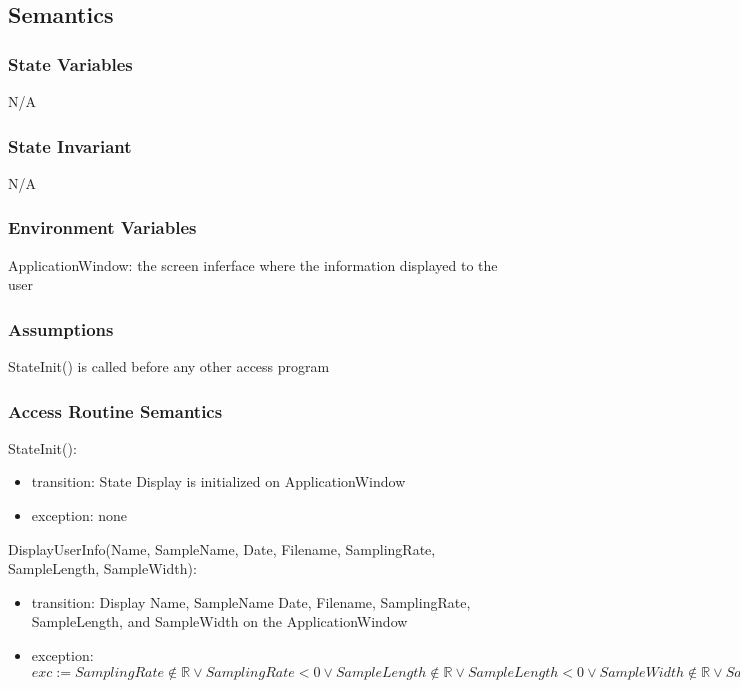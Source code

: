 \documentclass[12pt, titlepage]{article}
\begin{document}
\subsection{Semantics}

\subsubsection{State Variables}

N/A

\subsubsection{State Invariant}

N/A

\subsubsection{Environment Variables}

ApplicationWindow: the screen inferface where the information displayed to the user

\subsubsection{Assumptions}

StateInit() is called before any other access program

\subsubsection{Access Routine Semantics}

\noindent StateInit():
\begin{itemize}
\item transition: State Display is initialized on ApplicationWindow
\item exception: none
\end{itemize}

\noindent DisplayUserInfo(Name, SampleName, Date, Filename, SamplingRate, SampleLength, SampleWidth):
\begin{itemize}
\item transition: Display Name, SampleName Date, Filename, SamplingRate, SampleLength, and SampleWidth on the ApplicationWindow
\item exception: $exc:= SamplingRate \notin \mathbb{R} \lor SamplingRate < 0 \lor SampleLength \notin \mathbb{R} \lor SampleLength < 0 \lor SampleWidth \notin \mathbb{R} \lor SampleWidth < 0 \Rightarrow INVALID$
\end{itemize}
\end{document}
